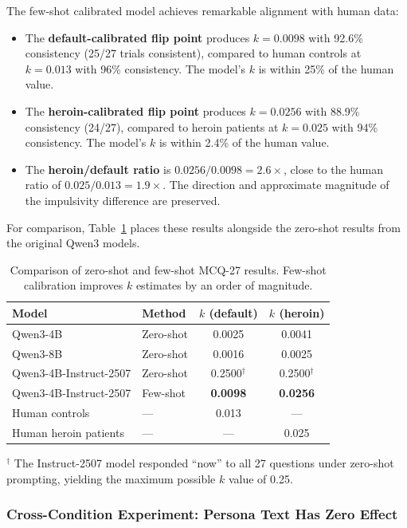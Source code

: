 \documentclass[11pt,a4paper]{article}
\begin{document}
The few-shot calibrated model achieves remarkable alignment with human data:
\begin{itemize}
    \item The \textbf{default-calibrated flip point} produces $k = 0.0098$ with 92.6\% consistency (25/27 trials consistent), compared to human controls at $k = 0.013$ with 96\% consistency. The model's $k$ is within 25\% of the human value.
    \item The \textbf{heroin-calibrated flip point} produces $k = 0.0256$ with 88.9\% consistency (24/27), compared to heroin patients at $k = 0.025$ with 94\% consistency. The model's $k$ is within 2.4\% of the human value.
    \item The \textbf{heroin/default ratio} is $0.0256 / 0.0098 = 2.6\times$, close to the human ratio of $0.025 / 0.013 = 1.9\times$. The direction and approximate magnitude of the impulsivity difference are preserved.
\end{itemize}

For comparison, Table~\ref{tab:fewshot-vs-zeroshot} places these results alongside the zero-shot results from the original Qwen3 models.

\begin{table}[H]
\centering
\caption{Comparison of zero-shot and few-shot MCQ-27 results. Few-shot calibration improves $k$ estimates by an order of magnitude.}
\label{tab:fewshot-vs-zeroshot}
\begin{tabular}{llcc}
\toprule
\textbf{Model} & \textbf{Method} & \textbf{$k$ (default)} & \textbf{$k$ (heroin)} \\
\midrule
Qwen3-4B & Zero-shot & 0.0025 & 0.0041 \\
Qwen3-8B & Zero-shot & 0.0016 & 0.0025 \\
Qwen3-4B-Instruct-2507 & Zero-shot & 0.2500$^\dagger$ & 0.2500$^\dagger$ \\
Qwen3-4B-Instruct-2507 & Few-shot & \textbf{0.0098} & \textbf{0.0256} \\
\midrule
Human controls & --- & 0.013 & --- \\
Human heroin patients & --- & --- & 0.025 \\
\bottomrule
\end{tabular}
\par\smallskip
{\footnotesize $^\dagger$ The Instruct-2507 model responded ``now'' to all 27 questions under zero-shot prompting, yielding the maximum possible $k$ value of 0.25.}
\end{table}

\subsubsection{Cross-Condition Experiment: Persona Text Has Zero Effect}
\label{sec:cross-condition}
\end{document}
